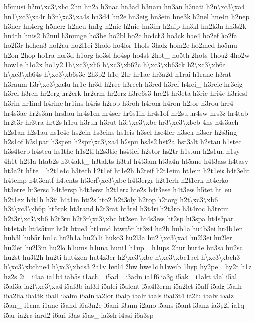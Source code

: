 \begin{DoxyCompactItemize}
h5musi h2m\textbackslash{}xc3\textbackslash{}xbc 2hn hn2a h3nac hn3ad h3nam hn3an h3nati h2n\textbackslash{}xc3\textbackslash{}xa4 hn1\textbackslash{}xc3\textbackslash{}xa4r h3n\textbackslash{}xc3\textbackslash{}xa4s hn3d4 hn2e hn3eig hn3ein hne3k h2nel hne4n h2nep h3ner hn4erg h5nerz h2neu hn1g h2nic h2nie hn3im h2nip hn3kl hn2k3n hn3s2k hn4th hnts2 h2nul h3nunge ho3be ho2bl ho2c ho4ch3 ho3ck hoe4 ho2ef ho2fa ho2f3r hohen3 hol2au ho2l1ei 2holo ho4lor 1hols 3holz hom2e ho2med ho5mu h2on 2hop ho1ra hor3d h1org ho3sl ho4sp ho4st 2hot\-\_\- ho5th 2hots 1hou2 4ho2w how1e h1o2x ho1y2 1h\textbackslash{}xc3\textbackslash{}xb6 h\textbackslash{}xc3\textbackslash{}xb62c h\textbackslash{}xc3\textbackslash{}xb63ck h2\textbackslash{}xc3\textbackslash{}xb6r h\textbackslash{}xc3\textbackslash{}xb64s h\textbackslash{}xc3\textbackslash{}xb6s3c 2h3p2 h1q 2hr hr1ac hr3a2d h1rai h1rane h3rat h3raum h3r\textbackslash{}xc3\textbackslash{}xa4u hr1c hr3d h2rec h3rech h3red h3ref h4rei\-\_\- h3reic hr3eig h3rel h3ren hr2erg hr2erk hr2erm hr2erz h3re6s3 hre2t hr3eta h3ric hri4e h3riesl h3rin hr1ind h4rine hr1ins h4ris h2rob h3roh h4rom h4ron h2ror h3rou hrr4 hr4s3ac hr2s3an hrs1au hr4s1en hr4ser hr6s1in hr4s1of hr2su hr4sw hrs3z hr4tab hr2t3r hr3tra hrt2s h1ru h3ruh h3rut h3r\textbackslash{}xc3\textbackslash{}xbc hr3\textbackslash{}xc3\textbackslash{}xbcb 4hs h4s3ach h2s1an h2s1au hs1e4c hs2ein hs3eins hs1eis h3sel hse4ler h3sen h3ser h2s3ing h2s1of h2s1par h3spen h2spr\textbackslash{}xc3\textbackslash{}xa4 h2spu hs3s2 hst2a hst3alt h2stau h1stec h3s4terb h4steu hs1the h1s2ti h2s3tie hs4tief h2stor hs2tr h1stun h2s1un h1sy 4h1t h2t1a htab2s h3t4akt\-\_\- h3takts h3tal h4t3am ht3a4n ht5ane h4t3ass h4tasy ht3a2t h5te\-\_\- h2t1e4c h3tech h2t1ef ht1e2h h2teif h2t1eim ht1ein h2t1eis h4t3elit h4temp h4t3entf h4tents ht3erf\textbackslash{}xc3\textbackslash{}xbc h4t3ergr h2t1erh h2t1erk ht4erko ht3erre ht3ersc h4t3ersp h4t3erst h2t1erz hte2s h4t3ese h4t3ess h5tet ht1eu h2t1ex h4t1h h3ti h4t1in hti2s hto2 h2t3oly h2top h2torg h2t\textbackslash{}xc3\textbackslash{}xb6 h3t\textbackslash{}xc3\textbackslash{}xb6p ht5rak ht3rand h2t3rat ht3rel h3t4ri h2t3ro h3t4roc h3trom h2t3r\textbackslash{}xc3\textbackslash{}xb6 h2t3ru h2t3r\textbackslash{}xc3\textbackslash{}xbc ht2sen ht4s3ess ht2sp ht3spa ht4s3par ht4stab ht4s5tur ht3t htue3 ht1und htwa5r ht3z4 hu2b hub1a hu4b3ei hu4b1en hub3l hub5r hu1c hu2h1a hu2h1i huko3 hu2l3a hu2l\textbackslash{}xc3\textbackslash{}xa4 hu2l3ei hu2ler hu2let hu2l3in hu2lo h1ums h1una huni1 h1up\-\_\- h1ups 2hur hur4e hu3sa hu2sc hu2st hu3t2h hu2ti hut4zen hut4z3er h2\textbackslash{}xc3\textbackslash{}xbc h\textbackslash{}xc3\textbackslash{}xbc1bel h\textbackslash{}xc3\textbackslash{}xbch3 h\textbackslash{}xc3\textbackslash{}xbchne4 h\textbackslash{}xc3\textbackslash{}xbcs3 2h1v hvil4 2hw hwe1c h1weib 1hyp hy2pe\-\_\- hy2t h1z hz2s 2i\-\_\- i4aa ia1b4 iab5s i1ach\-\_\- i5ad\-\_\- i3adn ia1f6 ia3g i5ak\-\_\- i1akt i3al i5al\-\_\- i5al3a ia2l\textbackslash{}xc3\textbackslash{}xa4 i5al3b ial3d i5alei i5alent i5a4l3erm i5a2let i5alf i5alg i5alh i5a2lia i5al3k i5all i5alm i5aln ia2lor i5alp i5alr i5als i5al3t4 ia2lu i5alv i5alz i5an\-\_\- i1ana i1anc i5and i6a3n2e i6ani i3ann i2ano i5ans i5ant i3anz ia3p2f ia1q i5ar ia2ra iard2 i6ari i3as i5as\-\_\- ia3sh i4asi i6a3sp 
\end{DoxyCompactItemize}
